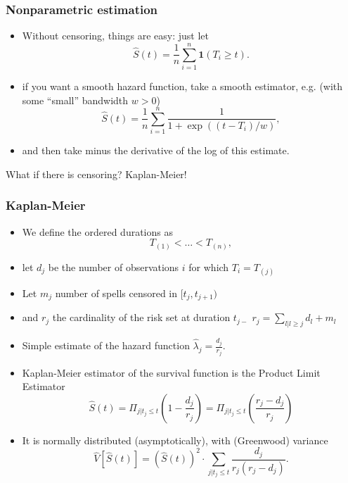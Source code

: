\documentclass[aspectratio=169]{beamer}
\begin{document}
\begin{frame}
\frametitle{Nonparametric estimation}
\begin{itemize}

\item Without censoring, things are easy: just let
\[
\hat{S}(t)=\frac{1}{n}\sum_{i=1}^n \mathbf{1} (T_i \geq  t).
\]
\item if you want a smooth hazard function, take a smooth estimator, e.g.
(with some ``small'' bandwidth $w>0$)
\[
\hat{S}(t)=\frac{1}{n}\sum_{i=1}^n \frac{1}{1+\exp((t-T_i)/w)},
\]
\item and then take minus the derivative of the log of this estimate.
\end{itemize}
\alert {What if there is censoring?} Kaplan-Meier!
\end{frame}


\begin{frame}
\frametitle{Kaplan-Meier}
\begin{itemize}
\item We define the
ordered durations as 
\[
T_{(1)} < \ldots < T_{(n)},
\]
\item let $d_j$ be the number of observations $i$ for which $T_i=T_{(j)}$
\item Let $m_j$ number of spells censored in $[t_j,t_{j+1})$
\item and $r_j$ the cardinality of the \alert{risk set}  at duration $t_{j-}$   $r_j=\sum_{l | l \geq j} d_l + m_l$
\item Simple estimate of the hazard function $\hat{\lambda}_j = \frac{d_j}{r_j}$.
\item Kaplan-Meier estimator  of the survival function is the \alert{Product Limit Estimator}
\[
\hat{S}(t)=\Pi_{j|t_j \leq t} \left(
1-\frac{d_j}{r_j}
\right) = \Pi_{j|t_j \leq t} \left(
\frac{r_j- d_j}{r_j}
\right)
\]
\item It is normally distributed (asymptotically), with (Greenwood) variance
\[
\hat{V}[\hat{S}(t)]=(\hat{S}(t))^2 \cdot \sum_{j|t_j \leq t}
\frac{d_j}{r_j(r_j-d_j)}.
\]
\end{itemize}
\end{frame}
\end{document}
